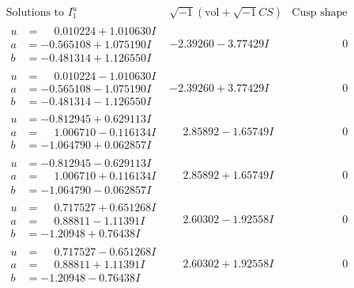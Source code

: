 \documentclass[1p]{elsarticle_modified}
\theoremstyle{definition}
\newcommand{\I}{\sqrt{-1}}
\begin{document}
$$\begin{array}{c|c|c}  
\text{Solutions to }I^u_{1}& \I (\text{vol} + \sqrt{-1}CS) & \text{Cusp shape}\\
 \hline 
\begin{aligned}
u &= \phantom{-}0.010224 + 1.010630 I \\
a &= -0.565108 + 1.075190 I \\
b &= -0.481314 + 1.126550 I\end{aligned}
 & -2.39260 - 3.77429 I & \phantom{-0.000000 } 0 \\ \hline\begin{aligned}
u &= \phantom{-}0.010224 - 1.010630 I \\
a &= -0.565108 - 1.075190 I \\
b &= -0.481314 - 1.126550 I\end{aligned}
 & -2.39260 + 3.77429 I & \phantom{-0.000000 } 0 \\ \hline\begin{aligned}
u &= -0.812945 + 0.629113 I \\
a &= \phantom{-}1.006710 - 0.116134 I \\
b &= -1.064790 + 0.062857 I\end{aligned}
 & \phantom{-}2.85892 - 1.65749 I & \phantom{-0.000000 } 0 \\ \hline\begin{aligned}
u &= -0.812945 - 0.629113 I \\
a &= \phantom{-}1.006710 + 0.116134 I \\
b &= -1.064790 - 0.062857 I\end{aligned}
 & \phantom{-}2.85892 + 1.65749 I & \phantom{-0.000000 } 0 \\ \hline\begin{aligned}
u &= \phantom{-}0.717527 + 0.651268 I \\
a &= \phantom{-}0.88811 - 1.11391 I \\
b &= -1.20948 + 0.76438 I\end{aligned}
 & \phantom{-}2.60302 - 1.92558 I & \phantom{-0.000000 } 0 \\ \hline\begin{aligned}
u &= \phantom{-}0.717527 - 0.651268 I \\
a &= \phantom{-}0.88811 + 1.11391 I \\
b &= -1.20948 - 0.76438 I\end{aligned}
 & \phantom{-}2.60302 + 1.92558 I & \phantom{-0.000000 } 0 \\ \hline\begin{aligned}

\end{aligned}
\end{array}$$
\end{document}
